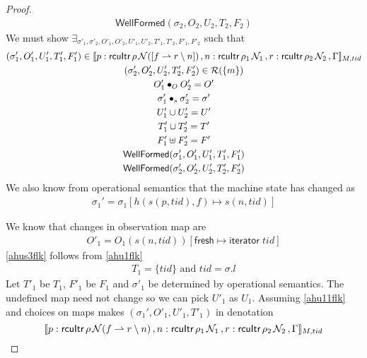 \begin{proof}
\begin{gather}
\label{ahu17flk}
\textsf{WellFormed}(\sigma_2,O_{2},U_{2},T_{2},F_2)
\end{gather}
We must show $\exists_{\sigma'_1, \sigma'_2, O'_{1}, O'_{2}, U'_{1}, U'_{2}, T'_{1}, T'_{2}, F'_1, F'_2}$ such that
\begin{gather}\label{phu5flk}
\begin{aligned}
(\sigma_1',O'_{1},U'_{1}, T'_{1},F'_1)  \in \llbracket p:\textsf{rcuItr}\, \rho \, \mathcal{N}([f\rightharpoonup r \setminus n]) \, , n:\textsf{rcuItr}\, \rho_1 \, \mathcal{N}_1 \, , r:\textsf{rcuItr}\, \rho_2\, \mathcal{N}_2\, ,  \Gamma \rrbracket_{M,tid}
\end{aligned}
\\
\label{phu6flk}
(\sigma_2',O'_{2},U'_{2}, T'_{2}, F'_2) \in \mathcal{R}(\{m\})
\\
\label{phu7flk}
O'_{1} \bullet_{O} O'_{2} = O'
\\
\label{ahusigf'lk}
\sigma'_1 \bullet_s \sigma'_2 = \sigma' \\
\label{phu8flk}
U'_{1} \cup U'_{2} = U'
\\
\label{phu9flk}
T'_{1} \cup T'_{2} = T'
\\
\label{phuffflk}
F'_1 \uplus F'_2 = F'
\\
\label{phu10flk}
\textsf{WellFormed}(\sigma_1',O'_{1},U'_{1},T'_{1},F'_1) \\
\label{phu11flk}
\textsf{WellFormed}(\sigma_2',O'_{2},U'_{2},T'_{2},F'_2)
\end{gather}
We also know from operational semantics that the machine state has changed as
\begin{gather}\label{ahusflk}
\sigma_1' =  \sigma_1[h(s(p,tid),f ) \mapsto s(n,tid) ]
\end{gather}

We know that changes in observation map are
\begin{gather}\label{ahus1flk}
O'_1 =  O_1(s(n,tid))[\textsf{fresh} \mapsto \textsf{iterator}\;tid ]
\end{gather}
\ref{ahus3flk} follows from \ref{ahu1flk}
\begin{gather}\label{ahus3flk}
  T_1 = \{tid\} \text{ and } tid = \sigma.l
\end{gather}
Let $T'_1$ be $T_1$, $F'_1$ be $F_1$ and $\sigma'_1$ be determined by operational semantics. The undefined map need not change so we can pick $U'_1$ as $U_1$. Assuming \ref{ahu11flk} and choices on maps makes $(\sigma_1',O'_{1},U'_{1}, T'_{1})$ in denotation
\[\llbracket p:\textsf{rcuItr}\, \rho \, \mathcal{N}(f \rightharpoonup r \setminus n) \, , n:\textsf{rcuItr}\, \rho_1 \, \mathcal{N}_1 \, , r:\textsf{rcuItr}\,\rho_2\,\mathcal{N}_2\, ,  \Gamma \rrbracket_{M,tid}\]


\end{proof}
